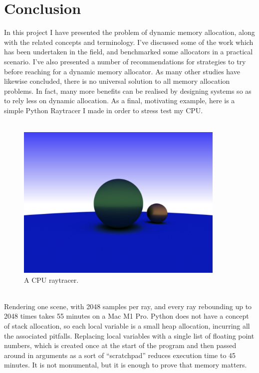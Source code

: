 \documentclass{article}
\begin{document}
\section{Conclusion}
In this project I have presented the problem of dynamic memory allocation, along with the related concepts and terminology. I've discussed some of the work which has been undertaken in the field, and benchmarked some allocators in a practical scenario.  I've also presented a number of recommendations for strategies to try before reaching for a dynamic memory allocator. As many other studies have likewise concluded, there is no universal solution to all memory allocation problems. In fact, many more benefits can be realised by designing systems so as to rely less on dynamic allocation.
As a final, motivating example, here is a simple Python Raytracer I made in order to stress test my CPU.\\
\\
\begin{figure}[htbp]
	\centering
	\includegraphics[width=10cm]{raytrace}
	\captionsetup{width=10cm}
	\caption{A CPU raytracer.}
\end{figure}
\\
Rendering one scene, with 2048 samples per ray, and every ray rebounding up to 2048 times takes 55 minutes on a Mac M1 Pro. Python does not have a concept of stack allocation, so each local variable is a small heap allocation, incurring all the associated pitfalls. Replacing local variables with a single list of floating point numbers, which is created once at the start of the program and then passed around in arguments as a sort of ``scratchpad'' reduces execution time to 45 minutes. It is not monumental, but it is enough to prove that memory matters.
\end{document}

